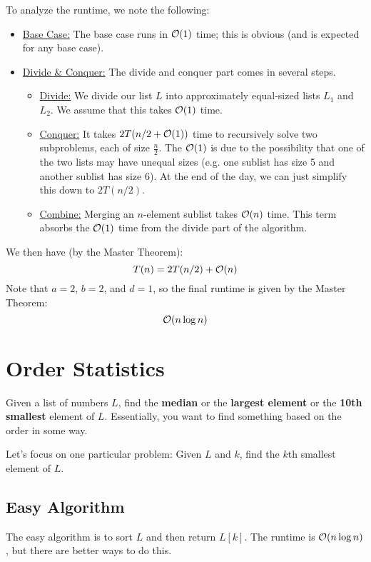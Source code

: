 \documentclass[letterpaper]{article}
\begin{document}
To analyze the runtime, we note the following:
\begin{itemize}
    \item \underline{Base Case:} The base case runs in $\mathcal{O}(1)$ time; this is obvious (and is expected for any base case).
    \item \underline{Divide \& Conquer:} The divide and conquer part comes in several steps. 
    \begin{itemize}
        \item \underline{Divide:} We divide our list $L$ into approximately equal-sized lists $L_1$ and $L_2$. We assume that this takes $\mathcal{O}(1)$ time. 
        \item \underline{Conquer:} It takes $2T(n / 2 + \mathcal{O}(1))$ time to recursively solve two subproblems, each of size $\frac{n}{2}$. The $\mathcal{O}(1)$ is due to the possibility that one of the two lists may have unequal sizes (e.g. one sublist has size 5 and another sublist has size 6). At the end of the day, we can just simplify this down to $2T(n / 2)$. 
        \item \underline{Combine:} Merging an $n$-element sublist takes $\mathcal{O}(n)$ time. This term absorbs the $\mathcal{O}(1)$ time from the divide part of the algorithm.  
    \end{itemize}
\end{itemize}
We then have (by the Master Theorem):
\[T(n) = 2T(n / 2) + \mathcal{O}(n)\]
Note that $a = 2$, $b = 2$, and $d = 1$, so the final runtime is given by the Master Theorem:
\[\mathcal{O}(n\log n)\]

\section{Order Statistics}
Given a list of numbers $L$, find the \textbf{median} or the \textbf{largest element} or the \textbf{10th smallest} element of $L$. Essentially, you want to find something based on the order in some way.

\bigskip 

Let's focus on one particular problem: Given $L$ and $k$, find the $k$th smallest element of $L$. 

\subsection{Easy Algorithm}
The easy algorithm is to sort $L$ and then return $L[k]$. The runtime is $\mathcal{O}(n \log n)$, but there are better ways to do this. 
\end{document}
